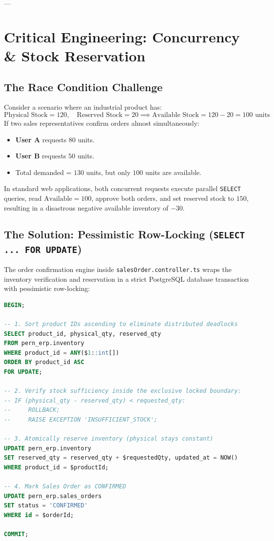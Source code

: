 \documentclass[11pt,a4paper]{article}
\begin{document}
---

\section{Critical Engineering: Concurrency \& Stock Reservation}

\subsection{The Race Condition Challenge}
Consider a scenario where an industrial product has:
\begin{equation}
\text{Physical Stock} = 120, \quad \text{Reserved Stock} = 20 \implies \text{Available Stock} = 120 - 20 = 100 \text{ units}
\end{equation}
If two sales representatives confirm orders almost simultaneously:
\begin{itemize}[itemsep=0.2em]
    \item \textbf{User A} requests $80$ units.
    \item \textbf{User B} requests $50$ units.
    \item Total demanded = $130$ units, but only $100$ units are available.
\end{itemize}
In standard web applications, both concurrent requests execute parallel \texttt{SELECT} queries, read $\text{Available} = 100$, approve both orders, and set reserved stock to $150$, resulting in a disastrous negative available inventory of $-30$.

\subsection{The Solution: Pessimistic Row-Locking (\texttt{SELECT ... FOR UPDATE})}
The order confirmation engine inside \texttt{salesOrder.controller.ts} wraps the inventory verification and reservation in a strict PostgreSQL database transaction with pessimistic row-locking:

\begin{lstlisting}[language=SQL, caption={Pessimistic Row-Locking Reservation Engine}]
BEGIN;

-- 1. Sort product IDs ascending to eliminate distributed deadlocks
SELECT product_id, physical_qty, reserved_qty 
FROM pern_erp.inventory 
WHERE product_id = ANY($1::int[]) 
ORDER BY product_id ASC 
FOR UPDATE;

-- 2. Verify stock sufficiency inside the exclusive locked boundary:
-- IF (physical_qty - reserved_qty) < requested_qty:
--     ROLLBACK;
--     RAISE EXCEPTION 'INSUFFICIENT_STOCK';

-- 3. Atomically reserve inventory (physical stays constant)
UPDATE pern_erp.inventory 
SET reserved_qty = reserved_qty + $requestedQty, updated_at = NOW() 
WHERE product_id = $productId;

-- 4. Mark Sales Order as CONFIRMED
UPDATE pern_erp.sales_orders 
SET status = 'CONFIRMED' 
WHERE id = $orderId;

COMMIT;
\end{lstlisting}
\end{document}
